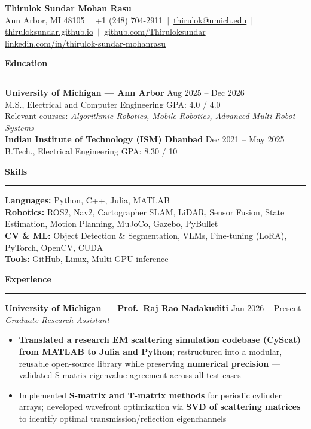 \documentclass[9pt]{article}
\newcommand{\sect}[1]{\vspace{4pt}\noindent\textbf{\large #1}\vspace{3pt}\hrule\vspace{6pt}}
\begin{document}
\begin{center}
  {\Large \textbf{Thirulok Sundar Mohan Rasu}}\\[3pt]
  Ann Arbor, MI 48105 $\,|\,$ +1 (248) 704-2911 $\,|\,$
  \href{mailto:thirulok@umich.edu}{thirulok@umich.edu} $\,|\,$
  \href{https://thiruloksundar.github.io}{thiruloksundar.github.io} $\,|\,$
  \href{https://github.com/Thiruloksundar}{github.com/Thiruloksundar} $\,|\,$
  \href{https://www.linkedin.com/in/thirulok-sundar-mohanrasu/}{linkedin.com/in/thirulok-sundar-mohanrasu}
\end{center}
\vspace{-3mm}

\sect{Education}
\textbf{University of Michigan --- Ann Arbor} \hfill Aug 2025 -- Dec 2026\\
M.S., Electrical and Computer Engineering \hfill GPA: 4.0 / 4.0\\
Relevant courses: \emph{Algorithmic Robotics, Mobile Robotics, Advanced Multi-Robot Systems}\\[5pt]
\textbf{Indian Institute of Technology (ISM) Dhanbad} \hfill Dec 2021 -- May 2025\\
B.Tech., Electrical Engineering \hfill GPA: 8.30 / 10

\sect{Skills}
\textbf{Languages:} Python, C++, Julia, MATLAB\\
\textbf{Robotics:} ROS2, Nav2, Cartographer SLAM, LiDAR, Sensor Fusion, State Estimation, Motion Planning, MuJoCo, Gazebo, PyBullet\\
\textbf{CV \& ML:} Object Detection \& Segmentation, VLMs, Fine-tuning (LoRA), PyTorch, OpenCV, CUDA\\
\textbf{Tools:} GitHub, Linux, Multi-GPU inference

\sect{Experience}

\textbf{University of Michigan --- Prof.\ Raj Rao Nadakuditi} \hfill Jan 2026 -- Present\\
\emph{Graduate Research Assistant}
\vspace{-2mm}
\begin{itemize}[leftmargin=*,noitemsep,topsep=1pt]
  \item \textbf{Translated a research EM scattering simulation codebase (CyScat) from MATLAB to Julia and Python}; restructured into a modular, reusable open-source library while preserving \textbf{numerical precision} --- validated S-matrix eigenvalue agreement across all test cases
  \item Implemented \textbf{S-matrix and T-matrix methods} for periodic cylinder arrays; developed wavefront optimization via \textbf{SVD of scattering matrices} to identify optimal transmission/reflection eigenchannels
\end{itemize}
\end{document}
